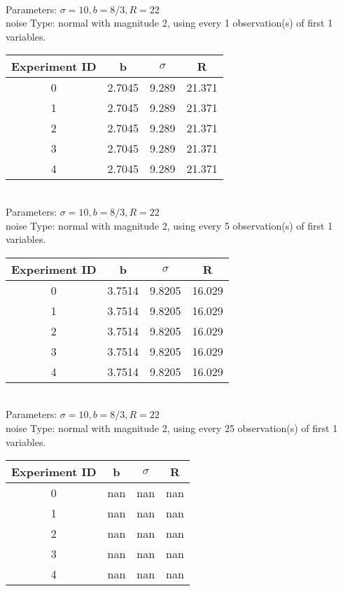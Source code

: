 \begin{multicols}{3}
\begin{tabular}{cccc}
 \end{tabular}\\
Parameters: $\sigma=10, b=8/3, R=22$\\
noise Type: normal with magnitude 2, using every 1 observation(s) of first 1 variables.\\
\begin{tabular}{cccc}
\hline Experiment ID & b & $\sigma$ & R \\ \hline 
0 & 2.7045 & 9.289 & 21.371\\ \hline 
 1 & 2.7045 & 9.289 & 21.371\\ \hline 
 2 & 2.7045 & 9.289 & 21.371\\ \hline 
 3 & 2.7045 & 9.289 & 21.371\\ \hline 
 4 & 2.7045 & 9.289 & 21.371\\ \hline 
 \end{tabular}\\
Parameters: $\sigma=10, b=8/3, R=22$\\
noise Type: normal with magnitude 2, using every 5 observation(s) of first 1 variables.\\
\begin{tabular}{cccc}
\hline Experiment ID & b & $\sigma$ & R \\ \hline 
0 & 3.7514 & 9.8205 & 16.029\\ \hline 
 1 & 3.7514 & 9.8205 & 16.029\\ \hline 
 2 & 3.7514 & 9.8205 & 16.029\\ \hline 
 3 & 3.7514 & 9.8205 & 16.029\\ \hline 
 4 & 3.7514 & 9.8205 & 16.029\\ \hline 
 \end{tabular}\\
Parameters: $\sigma=10, b=8/3, R=22$\\
noise Type: normal with magnitude 2, using every 25 observation(s) of first 1 variables.\\
\begin{tabular}{cccc}
\hline Experiment ID & b & $\sigma$ & R \\ \hline 
0 & nan & nan & nan\\ \hline 
 1 & nan & nan & nan\\ \hline 
 2 & nan & nan & nan\\ \hline 
 3 & nan & nan & nan\\ \hline 
 4 & nan & nan & nan\\ \hline 
 \end{tabular}\\

\end{multicols}
